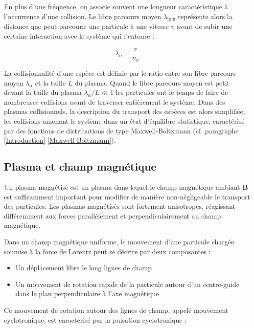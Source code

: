 \begin{refsection}
En plus d'une fréquence, on associe souvent une longueur caractéristique
à l'occurrence d'une collision. Le libre parcours moyen $\lambda_\text{lpm}$
représente alors la distance que peut parcourir une particule à une vitesse
$v$ avant de subir une certaine interaction avec le système qui l'entoure :

\begin{equation}
	\lambda_\alpha=\frac{v}{\nu_\alpha}
\end{equation} 

La collisionnalité d'une espèce est
définie par le ratio entre son libre parcours moyen $\lambda_\alpha$ et la
taille $L$ du plasma. Quand le libre parcours moyen est petit devant la
taille du plasma $\lambda_\alpha/L\ll 1$
les particules ont le temps de faire de nombreuses collisions avant de
traverser entièrement le système. Dans des plasmas collisionnels, la description
du transport des espèces est alors simplifiée, les collisions amenant le système dans un état
d'équilibre statistique, caractérisé par des fonctions de distributions de
type Maxwell-Boltzmann (cf. paragraphe \ref{Introduction}-\ref{Maxwell-Boltzmann}).

\parencite{Phelps}

\subsection{Plasma et champ magnétique} 
Un plasma magnétisé est un plasma dans lequel le champ magnétique ambiant
$\mathbf{B}$ est suffisamment important pour modifier de manière non-négligeable
le transport des particules. Les plasmas magnétisés sont fortement
anisotropes, réagissant différemment aux forces parallèlement et
perpendiculairement au champ magnétique.

Dans un champ magnétique uniforme, le mouvement d'une particule chargée
soumise à la force de Lorentz peut se décrire par deux composantes :

\begin{itemize}
  \item Un déplacement libre le long lignes de champ
  \item Un mouvement de rotation rapide de la particule
  autour d'un centre-guide dans le plan perpendiculaire à l'axe magnétique
\end{itemize}

Ce mouvement de rotation autour des lignes de champ, appelé mouvement
cyclotronique, est caractérisé par la pulsation cyclotronique : 


\end{refsection}
